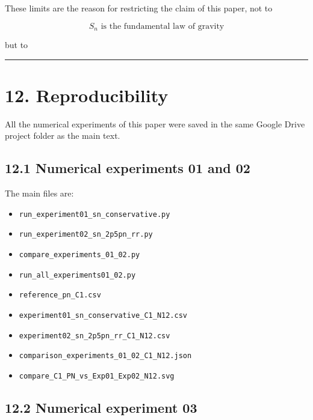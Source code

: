 \documentclass[
  a4paper,
]{article}
\providecommand{\tightlist}{%
  \setlength{\itemsep}{0pt}\setlength{\parskip}{0pt}}
\begin{document}
These limits are the reason for restricting the claim of this paper, not
to

\[
\boxed{
S_n\text{ is the fundamental law of gravity}
}
\]

but to

\begin{center}
\end{center}

\begin{center}\rule{0.5\linewidth}{0.5pt}\end{center}

\section{12. Reproducibility}\label{reproducibility}

All the numerical experiments of this paper were saved in the same
Google Drive project folder as the main text.

\subsection{12.1 Numerical experiments 01 and
02}\label{numerical-experiments-01-and-02}

The main files are:

\begin{itemize}
\tightlist
\item
  \texttt{run\_experiment01\_sn\_conservative.py}
\item
  \texttt{run\_experiment02\_sn\_2p5pn\_rr.py}
\item
  \texttt{compare\_experiments\_01\_02.py}
\item
  \texttt{run\_all\_experiments01\_02.py}
\item
  \texttt{reference\_pn\_C1.csv}
\item
  \texttt{experiment01\_sn\_conservative\_C1\_N12.csv}
\item
  \texttt{experiment02\_sn\_2p5pn\_rr\_C1\_N12.csv}
\item
  \texttt{comparison\_experiments\_01\_02\_C1\_N12.json}
\item
  \texttt{compare\_C1\_PN\_vs\_Exp01\_Exp02\_N12.svg}
\end{itemize}

\subsection{12.2 Numerical experiment 03}\label{numerical-experiment-03}
\end{document}
